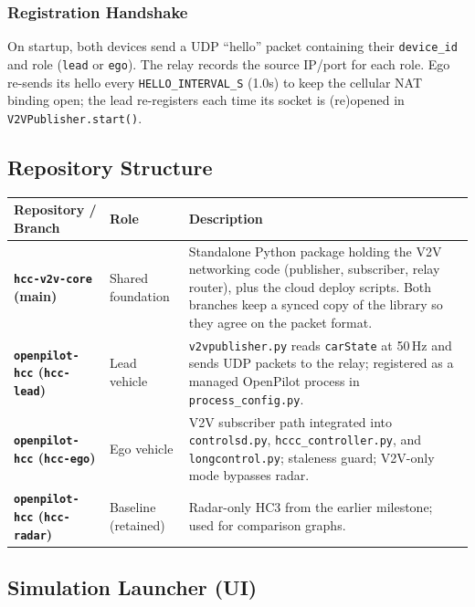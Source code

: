 \documentclass[12pt]{article}
\begin{document}
\subsubsection{Registration Handshake}

On startup, both devices send a UDP ``hello'' packet containing their \texttt{device\_id} and role (\texttt{lead} or \texttt{ego}). The relay records the source IP/port for each role. Ego re-sends its hello every \texttt{HELLO\_INTERVAL\_S} (1.0s) to keep the cellular NAT binding open; the lead re-registers each time its socket is (re)opened in \texttt{V2VPublisher.start()}.

\subsection{Repository Structure}

\begin{center}
\begin{tabular}{>{\bfseries}p{3.7cm} p{3.5cm} p{5.5cm}}
  \toprule
  Repository / Branch & Role & Description \\
  \midrule
  \texttt{hcc-v2v-core} (main) & Shared foundation & Standalone Python package holding the V2V networking code (publisher, subscriber, relay router), plus the cloud deploy scripts. Both branches keep a synced copy of the library so they agree on the packet format. \\
  \addlinespace
  \texttt{openpilot-hcc} (\texttt{hcc-lead}) & Lead vehicle & \texttt{v2vpublisher.py} reads \texttt{carState} at 50\,Hz and sends UDP packets to the relay; registered as a managed OpenPilot process in \texttt{process\_config.py}. \\
  \addlinespace
  \texttt{openpilot-hcc} (\texttt{hcc-ego}) & Ego vehicle & V2V subscriber path integrated into \texttt{controlsd.py}, \texttt{hccc\_controller.py}, and \texttt{longcontrol.py}; staleness guard; V2V-only mode bypasses radar. \\
  \addlinespace
  \texttt{openpilot-hcc} (\texttt{hcc-radar}) & Baseline (retained) & Radar-only HC3 from the earlier milestone; used for comparison graphs. \\
  \bottomrule
\end{tabular}
\end{center}

\subsection{Simulation Launcher (UI)}
\end{document}

